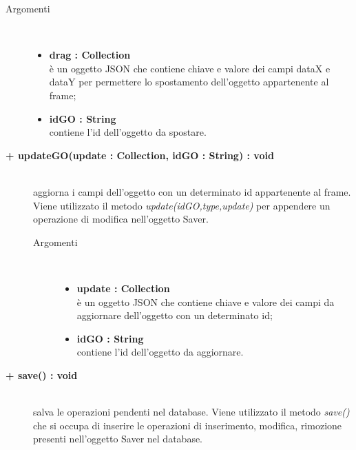 \begin{description}
\begin{description}
\begin{description}
\begin{description}
			\item[Argomenti] \hfill \\
				\begin{itemize}
					\item \textbf{drag : Collection			} \hfill \\
					è un oggetto JSON che contiene chiave e valore dei campi dataX e dataY per permettere lo spostamento dell'oggetto appartenente al frame;
					\item \textbf{idGO : String			} \hfill \\
					contiene l'id dell'oggetto da spostare.
				\end{itemize}

\end{description}

\end{description}

\begin{description}
		\item[\textbf{\color{blue}+ updateGO(update : Collection, idGO : String) : void			}] \hfill \\
			aggiorna i campi dell'oggetto con un determinato id appartenente al frame. Viene utilizzato il metodo \textit{update(idGO,type,update)} per appendere un operazione di modifica nell'oggetto Saver. 

\begin{description}
			\item[Argomenti] \hfill \\
				\begin{itemize}
						\item \textbf{update : Collection			} \hfill \\
					è un oggetto JSON che contiene chiave e valore dei campi da aggiornare dell'oggetto con un determinato id;
					\item \textbf{idGO : String			} \hfill \\
					contiene l'id dell'oggetto da aggiornare.
				\end{itemize}

\end{description}

\end{description}

\begin{description}
		\item[\textbf{\color{blue}+ save() : void			}] \hfill \\
			salva le operazioni pendenti nel database. Viene utilizzato il metodo \textit{save()} che si occupa di inserire le operazioni di inserimento, modifica, rimozione presenti nell'oggetto Saver nel database. 


\end{description}
\end{description}
\end{description}
